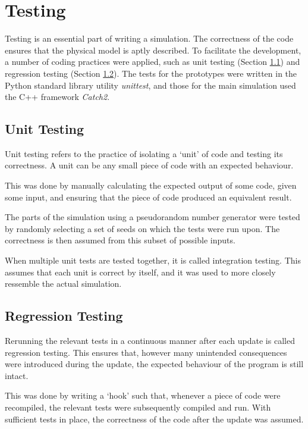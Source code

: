 \section{Testing}
\label{sec:Testing}

Testing is an essential part of writing a simulation. The correctness of the code ensures that the physical model is aptly described. To facilitate the development, a number of coding practices were applied, such as unit testing (Section \ref{sec:UnitTesting}) and regression testing (Section \ref{sec:RegressionTesting}). The tests for the prototypes were written in the Python standard library utility \textit{unittest}, and those for the main simulation used the C++ framework \textit{Catch2}.

\subsection{Unit Testing}
\label{sec:UnitTesting}

Unit testing refers to the practice of isolating a `unit' of code and testing its correctness. A unit can be any small piece of code with an expected behaviour.

This was done by manually calculating the expected output of some code, given some input, and ensuring that the piece of code produced an equivalent result.

The parts of the simulation using a pseudorandom number generator were tested by randomly selecting a set of seeds on which the tests were run upon. The correctness is then assumed from this subset of possible inputs.

When multiple unit tests are tested together, it is called integration testing. This assumes that each unit is correct by itself, and it was used to more closely ressemble the actual simulation.

\subsection{Regression Testing}
\label{sec:RegressionTesting}

Rerunning the relevant tests in a continuous manner after each update is called regression testing. This ensures that, however many unintended consequences were introduced during the update, the expected behaviour of the program is still intact.

This was done by writing a `hook' such that, whenever a piece of code were recompiled, the relevant tests were subsequently compiled and run. With sufficient tests in place, the correctness of the code after the update was assumed.
